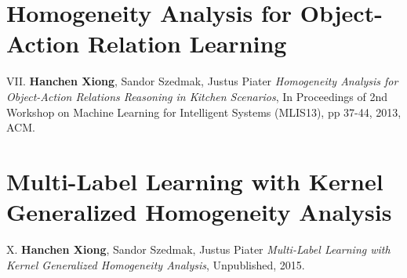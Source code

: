 \section{Homogeneity Analysis for Object-Action Relation Learning}
\label{sec:homo}
\begin{shaded}
{\Huge VII.} \textbf{Hanchen Xiong}, Sandor Szedmak, Justus Piater {\it Homogeneity Analysis for Object-Action Relations Reasoning in Kitchen Scenarios}, 
In Proceedings of 2nd Workshop on Machine Learning for Intelligent Systems (MLIS13), pp 37-44,  2013, ACM. 
\vspace{-.2cm}
\end{shaded}




\section{Multi-Label Learning with Kernel Generalized Homogeneity Analysis}
\label{sec:KGHA}
\begin{shaded}
 {\Huge X.} \textbf{Hanchen Xiong}, Sandor Szedmak, Justus Piater {\it Multi-Label Learning with Kernel Generalized Homogeneity Analysis}, 
Unpublished, 2015.
\end{shaded}



